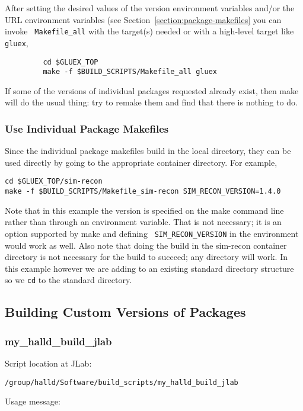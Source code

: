 \documentclass[12pt, letterpaper]{article}
\begin{document}
After setting the desired values of the version environment variables
and/or the URL environment variables (see
Section~\ref{section:package-makefiles} you can invoke {\tt
  Makefile\_all} with the target(s) needed or with a high-level target
like {\tt gluex},
\begin{verbatim}
         cd $GLUEX_TOP
         make -f $BUILD_SCRIPTS/Makefile_all gluex
\end{verbatim}
If some of the versions of individual packages requested already
exist, then make will do the usual thing: try to remake them and find
that there is nothing to do.

\subsubsection{Use Individual Package Makefiles}

Since the individual package makefiles build in the local directory,
they can be used directly by going to the appropriate container
directory. For example,
\begin{verbatim}
cd $GLUEX_TOP/sim-recon
make -f $BUILD_SCRIPTS/Makefile_sim-recon SIM_RECON_VERSION=1.4.0
\end{verbatim}
Note that in this example the version is specified on the make command
line rather than through an environment variable. That is not
necessary; it is an option supported by make and defining {\tt
  SIM\_RECON\_VERSION} in the environment would work as well. Also
note that doing the build in the sim-recon container directory is not
necessary for the build to succeed; any directory will work. In this
example however we are adding to an existing standard directory
structure so we {\tt cd} to the standard directory.

\subsection{Building Custom Versions of Packages}

\subsubsection{my\_halld\_build\_jlab}

Script location at JLab:

{\tt /group/halld/Software/build\_scripts/my\_halld\_build\_jlab}

Usage message:
\end{document}
